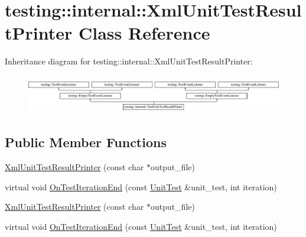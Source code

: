 \hypertarget{classtesting_1_1internal_1_1_xml_unit_test_result_printer}{\section{testing\-:\-:internal\-:\-:Xml\-Unit\-Test\-Result\-Printer Class Reference}
\label{classtesting_1_1internal_1_1_xml_unit_test_result_printer}
}
Inheritance diagram for testing\-:\-:internal\-:\-:Xml\-Unit\-Test\-Result\-Printer\-:\begin{figure}[H]
\begin{center}
\leavevmode
\includegraphics[height=1.700405cm]{classtesting_1_1internal_1_1_xml_unit_test_result_printer}
\end{center}
\end{figure}
\subsection*{Public Member Functions}
\begin{DoxyCompactItemize}
\item 
\hyperlink{classtesting_1_1internal_1_1_xml_unit_test_result_printer_afdaf88e6764c18ce0dcc3733d7a06e31}{Xml\-Unit\-Test\-Result\-Printer} (const char $\ast$output\-\_\-file)
\item 
virtual void \hyperlink{classtesting_1_1internal_1_1_xml_unit_test_result_printer_a2ae986dd2f4f2aed31cc6f3bc8c56898}{On\-Test\-Iteration\-End} (const \hyperlink{classtesting_1_1_unit_test}{Unit\-Test} \&unit\-\_\-test, int iteration)
\item 
\hyperlink{classtesting_1_1internal_1_1_xml_unit_test_result_printer_afdaf88e6764c18ce0dcc3733d7a06e31}{Xml\-Unit\-Test\-Result\-Printer} (const char $\ast$output\-\_\-file)
\item 
virtual void \hyperlink{classtesting_1_1internal_1_1_xml_unit_test_result_printer_a37cf92d3953b2be56f9fcb049a68846c}{On\-Test\-Iteration\-End} (const \hyperlink{classtesting_1_1_unit_test}{Unit\-Test} \&unit\-\_\-test, int iteration)
\end{DoxyCompactItemize}


